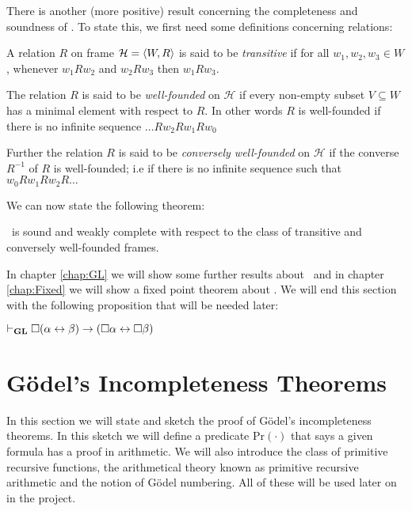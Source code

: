 \documentclass[../main.tex]{subfiles}
\begin{document}
There is another (more positive) result concerning the completeness and soundness of \GL. To
state this, we first need some definitions concerning relations:
\begin{defi}
	A relation $R$ on frame $\mathcal{H}=\langle W,R\rangle$ is said to be
	\textit{transitive} if for all $w_1,w_2,w_3\in W$, whenever $w_1Rw_2$
	and $w_2Rw_3$ then $w_1Rw_3$.
	
	The relation $R$ is said to be \textit{well-founded} on
	$\mathcal{H}$ if every non-empty  subset $V\subseteq W$ has a minimal
	element with respect to $R$. In other words $R$ is well-founded if
	there is no infinite sequence $\ldots Rw_2Rw_1Rw_0$

	Further the relation $R$ is said to be \textit{conversely well-founded}
	on $\mathcal{H}$ if the converse $R^{-1}$ of $R$ is well-founded; i.e
	if there is no infinite sequence such that $w_0Rw_1Rw_2R\ldots$
\end{defi}
We can now state the following theorem:
\begin{thm}
	\label{thm:GLcomplete}
	\GL\ is sound and weakly complete with respect to the class of
	transitive and conversely well-founded frames.
\end{thm}
In chapter \ref{chap:GL} we will show some further results about \GL\ and in
chapter
\ref{chap:Fixed} we will show a fixed point theorem about \GL.
We will end this section with the following proposition that will be needed
later:
\begin{prop}\label{prop:GL}
	$\vdash_{\text{\textbf{GL}}}\Box(\alpha\leftrightarrow\beta)\rightarrow(\Box\alpha\leftrightarrow\Box\beta)$
\end{prop}

\section{Gödel's Incompleteness Theorems}
In this section we will state and sketch the proof of Gödel's incompleteness
theorems. In this sketch we will define a predicate $\text{Pr}(\cdot)$ that
says a given formula has a proof in arithmetic. We will also introduce the
class of primitive recursive functions, the arithmetical theory known as
primitive recursive arithmetic and the notion of Gödel numbering. All of these
will be used later on in the project.
\end{document}
